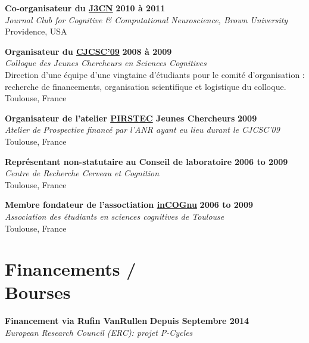 \documentclass[margin,line]{resume}
\begin{document}
\begin{resume}
	\vspace{-2mm} 
	\textbf{Co-organisateur du \href{https://sites.google.com/a/brown.edu/j3cn/}{J3CN}} \hfill \textbf{2010 à 2011}\\
	\textsl{Journal Club for Cognitive \& Computational Neuroscience, Brown University}\\
	 Providence, USA	

	\vspace{-2mm} 
	\textbf{Organisateur du \href{http://fresco.risc.cnrs.fr/cjcsc2009/}{CJCSC'09}} \hfill \textbf{2008 à 2009}\\
	\textsl{Colloque des Jeunes Chercheurs en Sciences Cognitives}\\
	Direction d'une équipe d'une vingtaine d'étudiants pour le comité d'organisation : recherche de financements, organisation scientifique et logistique du colloque.\\
	Toulouse, France	

	\vspace{-2mm} 
	\textbf{Organisateur de l'atelier \href{http://pirstec.risc.cnrs.fr}{PIRSTEC} Jeunes Chercheurs} \hfill \textbf{2009}\\
	\textsl{Atelier de Prospective financé par l'ANR ayant eu lieu durant le CJCSC'09}\\
	Toulouse, France	

	\vspace{-2mm} 
	\textbf{Représentant non-statutaire au Conseil de laboratoire} \hfill \textbf{2006 to 2009}\\
	\textsl{Centre de Recherche Cerveau et Cognition}\\
	Toulouse, France	

	\vspace{-2mm} 
	\textbf{Membre fondateur de l'assoctiation \href{http://incognu.fr/}{inCOGnu}} \hfill \textbf{2006 to 2009}\\
	\textsl{Association des étudiants en sciences cognitives de Toulouse}\\
	Toulouse, France	


\vspace{3mm}
    \section{\mysidestyle Financements /\\Bourses}

 	\textbf{Financement via Rufin VanRullen} \hfill \textbf{Depuis Septembre 2014}\\
 	\textsl{European Research Council (ERC): projet P-Cycles}
 

\end{resume}
\end{document}
